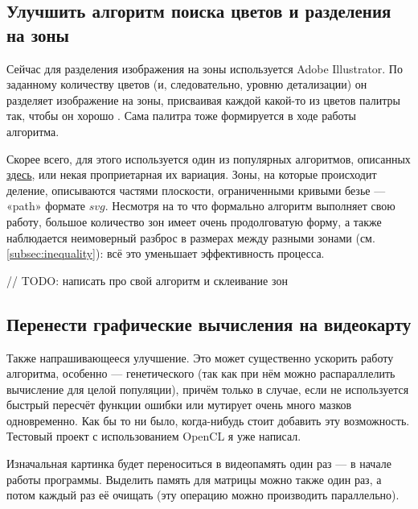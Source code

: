 \subsection{Улучшить алгоритм поиска цветов и разделения на зоны}

Сейчас для разделения изображения на зоны используется Adobe Illustrator.
По заданному количеству цветов (и, следовательно, уровню детализации) он разделяет изображение на зоны,
присваивая каждой какой-то из цветов палитры так, чтобы он хорошо .
Сама палитра тоже формируется в ходе работы алгоритма.

Скорее всего, для этого используется один из популярных алгоритмов, описанных \href{https://en.wikipedia.org/wiki/Color_quantization}{здесь}, или некая проприетарная их вариация.
Зоны, на которые происходит деление, описываются частями плоскости, ограниченными кривыми безье — «path»  формате $svg$.
Несмотря на то что формально алгоритм выполняет свою работу, большое количество зон имеет очень продолговатую форму,
а также наблюдается неимоверный разброс в размерах между разными зонами (см. \ref{subsec:inequality}):
всё это уменьшает эффективность процесса.

// TODO: написать про свой алгоритм и склеивание зон

\subsection{Перенести графические вычисления на видеокарту}\label{subsec:move_graphics_to_videocard}
Также напрашивающееся улучшение.
Это может существенно ускорить работу алгоритма, особенно — генетического (так как при нём можно распараллелить вычисление для целой популяции),
причём только в случае, если не используется быстрый пересчёт функции ошибки или мутирует очень много мазков одновременно.
Как бы то ни было, когда-нибудь стоит добавить эту возможность.
Тестовый проект с использованием OpenCL я уже написал.

Изначальная картинка будет переноситься в видеопамять один раз — в начале работы программы.
Выделить память для матрицы можно также один раз, а потом каждый раз её очищать (эту операцию можно производить параллельно).

